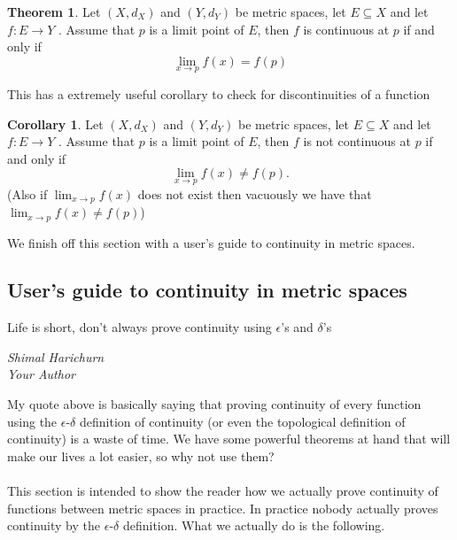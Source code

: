 \documentclass[12pt]{article}
\theoremstyle{definition}
\newtheorem{theorem}{Theorem}
\numberwithin{theorem}{subsection}
\newtheorem{corollary}{Corollary}
\numberwithin{corollary}{subsection}
\theoremstyle{remark}
\theoremstyle{point}
\begin{document}
	 \begin{theorem}
	 	Let $(X, d_X)$ and $(Y, d_Y)$ be metric spaces, let $E \subseteq X$ and let $f : E \to Y$ . Assume that $p$ is a limit point of $E$, then $f$ is continuous at $p$ if and only if $$\lim_{x \to p} f(x) = f(p)$$
	 \end{theorem}
	 
	 This has a extremely useful corollary to check for discontinuities of a function
	 
	 \begin{corollary}
	 	Let $(X, d_X)$ and $(Y, d_Y)$ be metric spaces, let $E \subseteq X$ and let $f : E \to Y$ . Assume that $p$ is a limit point of $E$, then $f$ is not continuous at $p$ if and only if $$\lim_{x \to p} f(x) \neq f(p).$$ (Also if $ \lim_{x \to p} f(x)$ does not exist then vacuously we have that $\lim_{x \to p} f(x) \neq f(p)$)
	 \end{corollary}
	 
	 We finish off this section with a user's guide to continuity in metric spaces.
	 
	 \subsection{User's guide to continuity in metric spaces}
	 
	 \epigraph{Life is short, don't always prove continuity using $\epsilon$'s and $\delta$'s}{\textit{Shimal Harichurn \\ Your Author}}
	 
	 My quote above is basically saying that proving continuity of every function using the $\epsilon$-$\delta$ definition of continuity (or even the topological definition of continuity) is a waste of time. We have some powerful theorems at hand that will make our lives a lot easier, so why not use them?  \\ \\ This section is intended to show the reader how we actually prove continuity of functions between metric spaces in practice. In practice nobody actually proves continuity by the $\epsilon$-$\delta$ definition. What we actually do is the following.
	 
\end{document}
